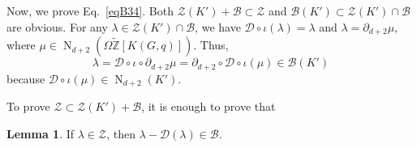 \documentclass[reprint, amsmath, amssymb, showpacs, floatfix, longbibliography, aps, twocolumn, superscriptaddress, nofootinbib]{revtex4-2}
\newcommand{\tZ}{{\widetilde{\mathbb Z}}}
\theoremstyle{definition}
\newtheorem{lemma}{Lemma}[section]
\begin{document}
 Now, we prove Eq.~\eqref{eqB34}. Both $\mathcal{Z}(K')+\mathcal{B}\subset \mathcal{Z}$ and $\mathcal{B}(K')\subset \mathcal{Z}(K')\cap\mathcal{B}$ are obvious. For any $\lambda\in\mathcal{Z}(K')\cap\mathcal{B}$, we have $\mathcal{D}\circ \iota(\lambda)=\lambda$ and $\lambda=\partial_{d+2}\mu$, where $\mu\in \operatorname{N}_{d+2}(\Omega\tZ[K(G,q)])$. Thus, 
 \begin{equation}
 	\lambda=\mathcal{D}\circ \iota \circ \partial_{d+2}\mu=\partial_{d+2}\circ \mathcal{D}\circ \iota( \mu)\in \mathcal{B}(K')
 \end{equation}
because $\mathcal{D}\circ \iota (\mu)\in \operatorname{N}_{d+2}(K')$. 

To prove $\mathcal{Z}\subset \mathcal{Z}(K')+\mathcal{B}$, it is enough to prove that
\begin{lemma}
	If $\lambda\in \mathcal{Z}$, then $\lambda-\mathcal{D}(\lambda)\in\mathcal{B}$.
\end{lemma}
\end{document}
